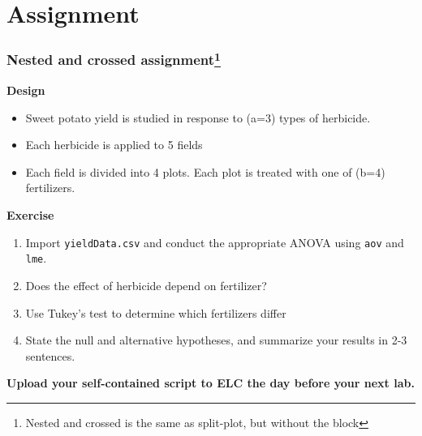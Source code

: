 \documentclass[color=usenames,dvipsnames]{beamer}\usepackage[]{graphicx}\usepackage[]{color}
\newcommand{\inr}[1]{\colorbox{inlinecolor}{\texttt{#1}}}
\begin{document}
\section{Assignment}




\begin{frame}[fragile]
  \frametitle{Nested and crossed assignment\footnote{Nested and crossed
      is the same as split-plot, but without the block}}

\small
{\bf Design}
\begin{itemize}%
  \footnotesize
  \item Sweet potato yield is studied in response to (a=3)
    types of herbicide.
  \item Each herbicide is applied to 5 fields
  \item Each field is divided into 4 plots. Each plot is treated with
    one of (b=4) fertilizers.
\end{itemize}
\pause
\vfill
{\bf Exercise}
\begin{enumerate}[(1)]%
  \footnotesize
  \item Import {\tt yieldData.csv} and conduct
    the appropriate ANOVA using \inr{aov} and \inr{lme}.
  \item Does the effect of herbicide depend on fertilizer?
  \item Use Tukey's test to determine which fertilizers differ
  \item State the null and alternative hypotheses, and summarize your
    results in 2-3 sentences. 
\end{enumerate}
\vfill
\footnotesize
\bf
Upload your self-contained script to ELC the day before your next lab. \\
\vfill
\end{frame}






\end{document}
